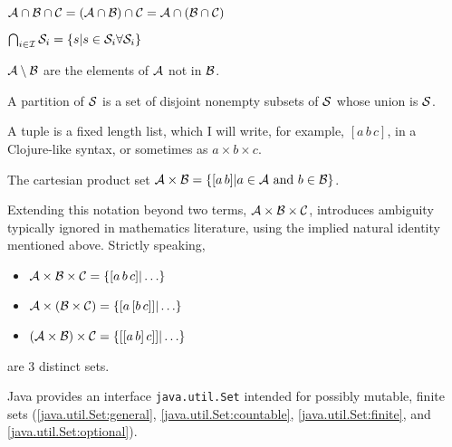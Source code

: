 $\mathcal{A} \cap \mathcal{B} \cap \mathcal{C} 
= (\mathcal{A} \cap \mathcal{B}) \cap \mathcal{C} 
= \mathcal{A} \cap (\mathcal{B} \cap \mathcal{C}) $

$\bigcap_{i \in \mathcal{I}} \mathcal{S}_{i} = \{ s | s \in \mathcal{S}_{i}
\forall \mathcal{S}_{i} \}$

$\mathcal{A} \setminus \mathcal{B}$ are the elements of $\mathcal{A}$ 
not in $\mathcal{B}$.

A partition of $\mathcal{S}$ is a set of disjoint nonempty subsets of
$\mathcal{S}$ whose union is $\mathcal{S}$.


A tuple is a fixed length list, which I will write, for example,
$[a \, b \, c]$, in a Clojure-like syntax,
or sometimes as $a \times b \times c$.

The cartesian product set 
$\mathcal{A} \times \mathcal{B} =
\{[a \, b] | a \in \mathcal{A} \text{ and } b \in \mathcal{B}\}$.

Extending this notation beyond two terms,
$\mathcal{A} \times \mathcal{B} \times \mathcal{C}$,
introduces ambiguity typically ignored in mathematics literature,
using the implied natural identity mentioned above.
Strictly speaking,
\begin{itemize}
  \item $\mathcal{A} \times \mathcal{B} \times \mathcal{C} = 
  \{[a \, b \, c] | \ldots \}$
  \item $\mathcal{A} \times (\mathcal{B} \times \mathcal{C}) = 
  \{[a \, [b \,c]] | \ldots \}$
  \item $(\mathcal{A} \times \mathcal{B}) \times \mathcal{C} = 
  \{[[a \, b] \, c]] | \ldots \}$
\end{itemize}
are 3 distinct sets.


\lstset{language=Java}

Java provides an interface \lstinline|java.util.Set| intended for
possibly mutable, finite sets (\autoref{java.util.Set:general},
 \autoref{java.util.Set:countable}, 
 \autoref{java.util.Set:finite}, 
 and
\autoref{java.util.Set:optional}).

